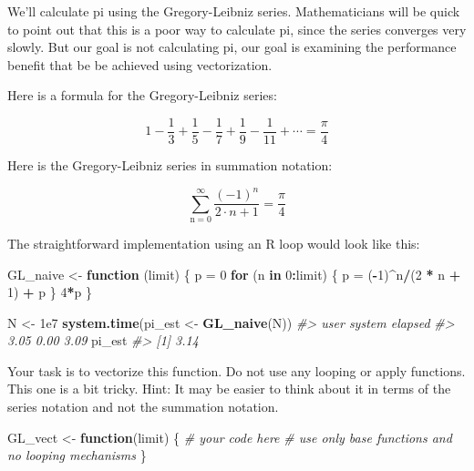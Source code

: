 \documentclass[]{book}
\newenvironment{Shaded}{\begin{snugshade}}{\end{snugshade}}
\newcommand{\KeywordTok}[1]{\textcolor[rgb]{0.13,0.29,0.53}{\textbf{#1}}}
\newcommand{\DecValTok}[1]{\textcolor[rgb]{0.00,0.00,0.81}{#1}}
\newcommand{\FloatTok}[1]{\textcolor[rgb]{0.00,0.00,0.81}{#1}}
\newcommand{\StringTok}[1]{\textcolor[rgb]{0.31,0.60,0.02}{#1}}
\newcommand{\CommentTok}[1]{\textcolor[rgb]{0.56,0.35,0.01}{\textit{#1}}}
\newcommand{\ControlFlowTok}[1]{\textcolor[rgb]{0.13,0.29,0.53}{\textbf{#1}}}
\newcommand{\OperatorTok}[1]{\textcolor[rgb]{0.81,0.36,0.00}{\textbf{#1}}}
\newcommand{\NormalTok}[1]{#1}
\theoremstyle{definition}
\theoremstyle{definition}
\theoremstyle{definition}
\theoremstyle{remark}
\begin{document}
We'll calculate pi using the Gregory-Leibniz series. Mathematicians will
be quick to point out that this is a poor way to calculate pi, since the
series converges very slowly. But our goal is not calculating pi, our
goal is examining the performance benefit that be be achieved using
vectorization.

Here is a formula for the Gregory-Leibniz series:

\begin{equation}
1 - \frac{1}{3} + \frac{1}{5} - \frac{1}{7} + \frac{1}{9} - \frac{1}{11} + \cdots = \frac{\pi}{4}
\end{equation}

Here is the Gregory-Leibniz series in summation notation:

\begin{equation}
\sum_{\text{n}=0}^{\infty} \frac{(-1)^n}{2\cdot n + 1} = \frac{\pi}{4}
\end{equation}

The straightforward implementation using an R loop would look like this:

\begin{Shaded}
\begin{Highlighting}[]
\NormalTok{GL_naive <-}\StringTok{ }\ControlFlowTok{function}\NormalTok{ (limit) \{}
\NormalTok{  p =}\StringTok{ }\DecValTok{0}
  \ControlFlowTok{for}\NormalTok{ (n }\ControlFlowTok{in} \DecValTok{0}\OperatorTok{:}\NormalTok{limit) \{}
\NormalTok{    p =}\StringTok{ }\NormalTok{(}\OperatorTok{-}\DecValTok{1}\NormalTok{)}\OperatorTok{^}\NormalTok{n}\OperatorTok{/}\NormalTok{(}\DecValTok{2} \OperatorTok{*}\StringTok{ }\NormalTok{n }\OperatorTok{+}\StringTok{ }\DecValTok{1}\NormalTok{) }\OperatorTok{+}\StringTok{ }\NormalTok{p}
\NormalTok{    \}}
  \DecValTok{4}\OperatorTok{*}\NormalTok{p}
\NormalTok{\}}

\NormalTok{N <-}\StringTok{ }\FloatTok{1e7}
\KeywordTok{system.time}\NormalTok{(pi_est <-}\StringTok{ }\KeywordTok{GL_naive}\NormalTok{(N))}
\CommentTok{#>    user  system elapsed }
\CommentTok{#>    3.05    0.00    3.09}
\NormalTok{pi_est}
\CommentTok{#> [1] 3.14}
\end{Highlighting}
\end{Shaded}

Your task is to vectorize this function. Do not use any looping or apply
functions. This one is a bit tricky. Hint: It may be easier to think
about it in terms of the series notation and not the summation notation.

\begin{Shaded}
\begin{Highlighting}[]
\NormalTok{GL_vect <-}\StringTok{ }\ControlFlowTok{function}\NormalTok{(limit) \{}
  \CommentTok{# your code here}
  \CommentTok{# use only base functions and no looping mechanisms}
\NormalTok{\}}
\end{Highlighting}
\end{Shaded}
\end{document}
